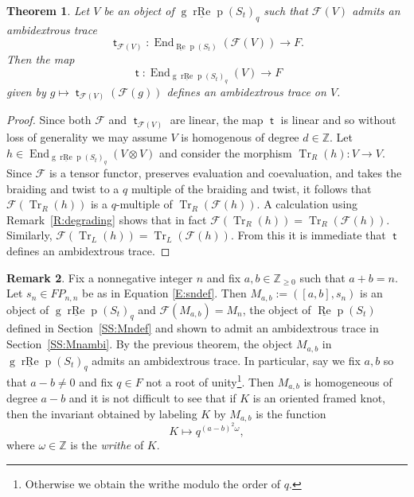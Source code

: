 \documentclass[12pt, reqno]{amsart}
\newtheorem{theorem}{Theorem}[section]
\theoremstyle{definition}
\newtheorem{remark}[theorem]{Remark}
\newcommand{\Tr}{\text{Tr}}%
\newcommand{\End}{\operatorname{End}}
\def\uRep{\underline{\operatorname{Re}}\!\operatorname{p}}
\newcommand{\F}{\mathcal{F}}
\renewcommand{\1}{_{(1)}}
\renewcommand{\2}{_{(2)}}
\newcommand{\3}{_{(3)}}
\newcommand{\4}{_{(4)}}
\newcommand{\Z}{\mathbb{Z}}
\def\gruRep{\operatorname{g}\!\underline{\operatorname{rRe}}\!\operatorname{p}}
\newcommand{\mt}{\operatorname{\mathsf{t}}}
\renewcommand{\Tr}{\operatorname{Tr}}
\begin{document}
\begin{theorem}\label{T:gradedambis}  Let $V$ be an object of $\gruRep(S_{t})_{q}$ such that $\F(V)$ admits an ambidextrous trace 
\[
\mt_{\F(V)}: \End_{\uRep(S_{t})}(\F(V)) \to F .
\]  Then the map 
\[
\mt: \End_{\gruRep(S_{t})_{q}}(V) \to F 
\] given by $g \mapsto \mt_{\F(V)}(\F(g))$ defines an ambidextrous trace on $V$.
\end{theorem}

\begin{proof} Since both $\F$ and $\mt_{\F(V)}$ are linear, the map $\mt$ is linear and so without loss of generality we may assume $V$ is homogenous of degree $d \in \Z$.  Let $h \in \End_{\gruRep(S_{t})_{q}}(V \otimes V)$ and consider the morphism $\Tr_{R}(h): V \to V$.  Since $\F$ is a tensor functor, preserves evaluation and coevaluation, and takes the braiding and twist to a $q$ multiple of the braiding and twist, it follows that $\F(\Tr_{R}(h))$ is a $q$-multiple of $\Tr_{R}(\F(h))$.  A calculation using Remark~\ref{R:degrading} shows that in fact $\F(\Tr_{R}(h))=\Tr_{R}(\F(h))$. Similarly, $\F(\Tr_{L}(h))=\Tr_{L}(\F(h))$.  From this it is immediate that $\mt$ defines an ambidextrous trace.
\end{proof}

\begin{remark}\label{R:gradedambis}  Fix a nonnegative integer $n$ and fix $a,b \in \Z_{\geq 0}$ such that $a+b = n$.  Let $s_{n} \in FP_{n,n}$ be as in Equation \ref{E:sndef}.  Then $M_{a,b}:=([a,b], s_{n})$ is an object of $\gruRep(S_{t})_{q}$ and $\F(M_{a,b})=M_{n}$, the object of $\uRep(S_{t})$ defined in Section~\ref{SS:Mndef} and shown to admit an ambidextrous trace in Section~\ref{SS:Mnambi}.  By the previous theorem, the object $M_{a,b}$ in  $\gruRep(S_{t})_{q}$ admits an ambidextrous trace.  In particular, say we fix $a,b$ so that $a-b \neq 0$ and fix $q \in F$ not a root of unity\footnote{Otherwise we obtain the writhe modulo the order of $q$.}.  Then  $M_{a,b}$ is homogeneous of degree $a-b$ and it is not difficult to see that if $K$ is an oriented framed knot, then the invariant obtained by labeling $K$ by $M_{a,b}$ is the function 
\[
K \mapsto q^{(a-b)^{2}\omega},
\] where $\omega \in \Z$ is the \emph{writhe} of $K$.  


\end{remark}














\renewcommand{\bibname}{\textsc{references}} 
	
%	
	\addcontentsline{toc}{chapter}{\bibname}
			

\vfill\vfill\vfill
\end{document}
